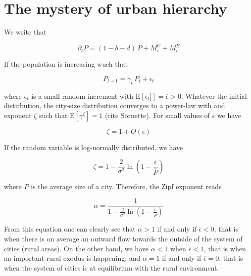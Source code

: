 %
\chapter{The mystery of urban hierarchy}
\label{sec:concepts}


We write that 

\begin{equation}
    \partial_t P = \left(1-b-d\right)\,P + M_i^U + M_i^E
\end{equation} 

If the population is increasing wuch that

\begin{equation}
    P_{t+1} = \gamma_t\,P_t + \epsilon_t
\end{equation}

where $\epsilon_t$ is a small random increment with
$\mathrm{E}\left[\epsilon_t]\right] = \overline{\epsilon} > 0$. Whatever the
initial distirbution, the city-size distribution converges to a power-law with
and exponent $\zeta$ such that $\mathrm{E}\left[\gamma^\zeta\right] = 1$ (cite
Sornette). For small values of $\overline{\epsilon}$ we have

\begin{equation}
    \zeta = 1 + O(\epsilon)
\end{equation}

If the random variable is log-normally distributed, we have

\begin{equation}
    \zeta = 1 - \frac{2}{\sigma^2} \ln\left(1 -
    \frac{\overline{\epsilon}}{\overline{P}}\right)
\end{equation}

where $\overline{P}$ is the average size of a city. Therefore, the Zipf exponent
reads

\begin{equation}
    \boxed{    \alpha = \frac{1}{1 - \frac{2}{\sigma^2} \ln\left(1 -
\frac{\overline{\epsilon}}{\overline{P}}\right)}}
\end{equation}

From this equation one can clearly see that $\alpha > 1$ if and only if
$\overline{\epsilon} < 0$, that is when there is on average an outward flow
towards the outside of the system of cities (rural areas). On the other hand, we
have $\alpha < 1$ when $\overline{\epsilon} < 1$, that is when an important
rural exodus is happening, and $\alpha = 1$ if and only if $\overline{\epsilon}
= 0$, that is when the system of cities is at equilibrium with the rural
environment.
